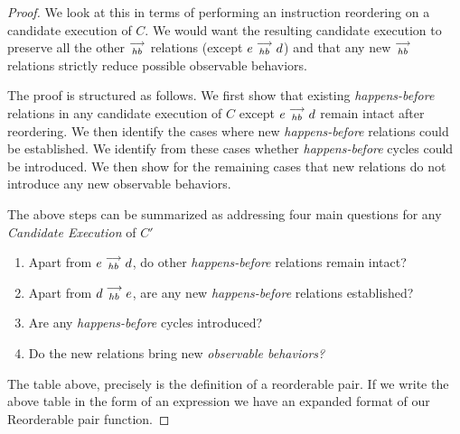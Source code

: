 \begin{proof}

    We look at this in terms of performing an instruction reordering on a candidate execution of $C$. We would want the resulting candidate execution to preserve all the other $\stackrel{\longrightarrow}{_{hb}}$ relations (except $e\stackrel{\longrightarrow}{_{hb}}d$) and that any new $\stackrel{\longrightarrow}{_{hb}}$ relations strictly reduce possible observable behaviors.
    
    The proof is structured as follows. We first show that existing \textit{happens-before} relations in any candidate execution of $C$ except $e\stackrel{\longrightarrow}{_{hb}}d$ remain intact after reordering. We then identify the cases where new \textit{happens-before} relations could be established. We identify from these cases whether \textit{happens-before} cycles could be introduced.
    We then show for the remaining cases that new relations do not introduce any new observable behaviors.

    The above steps can be summarized as addressing four main questions for any \textit{Candidate Execution} of $C'$
    \begin{enumerate}
        \item Apart from $e\stackrel{\longrightarrow}{_{hb}}d$, do other \emph{happens-before} relations remain intact?
        \item Apart from $d\stackrel{\longrightarrow}{_{hb}}e$, are any new \emph{happens-before} relations established? 
        \item Are any \emph{happens-before} cycles introduced? 
        \item Do the new relations bring new \emph{observable behaviors?}
    \end{enumerate}
    
    
    
    
    

    

    
    The table above, precisely is the definition of a reorderable pair. If we write the above table in the form of an expression we have an expanded format of our Reorderable pair function. 


\end{proof}

